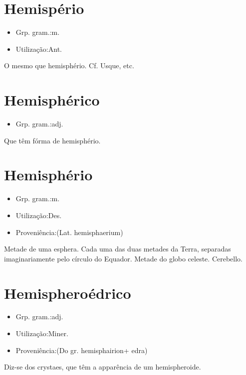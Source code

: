 \documentclass{article}
\begin{document}
\section{Hemispério}
\begin{itemize}
\item {Grp. gram.:m.}
\end{itemize}
\begin{itemize}
\item {Utilização:Ant.}
\end{itemize}
O mesmo que \textunderscore hemisphério\textunderscore . Cf. Usque, etc.
\section{Hemisphérico}
\begin{itemize}
\item {Grp. gram.:adj.}
\end{itemize}
Que têm fórma de hemisphério.
\section{Hemisphério}
\begin{itemize}
\item {Grp. gram.:m.}
\end{itemize}
\begin{itemize}
\item {Utilização:Des.}
\end{itemize}
\begin{itemize}
\item {Proveniência:(Lat. \textunderscore hemisphaerium\textunderscore )}
\end{itemize}
Metade de uma esphera.
Cada uma das duas metades da Terra, separadas imaginariamente pelo círculo do Equador.
Metade do globo celeste.
Cerebello.
\section{Hemispheroédrico}
\begin{itemize}
\item {Grp. gram.:adj.}
\end{itemize}
\begin{itemize}
\item {Utilização:Miner.}
\end{itemize}
\begin{itemize}
\item {Proveniência:(Do gr. \textunderscore hemisphairion\textunderscore  + \textunderscore edra\textunderscore )}
\end{itemize}
Diz-se dos crystaes, que têm a apparência de um hemispheroide.
\end{document}
